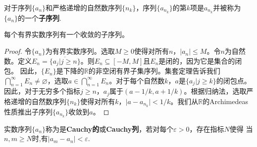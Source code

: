 \documentclass[lang=cn,newtx,10pt,scheme=chinese]{../Template/elegantbook}
\begin{document}
\begin{definition}[子序列]\label{definition:子序列}
  对于序列\(\{a_n\}\)和严格递增的自然数序列\(\{n_k\}\)，序列\(\{a_{n_k}\}\)的第\(k\)项是\(a_{n_k}\)并被称为\(\{a_n\}\)的一个\textbf{子序列}.
\end{definition}

\begin{theorem}\label{theorem:Bolzano - Weierstrass定理1}
  每个有界实数序列有一个收敛的子序列。
\end{theorem}
\begin{proof}
  令\(\{a_n\}\)为有界实数序列。选取\(M\geqslant0\)使得对所有\(n\)，\(\vert a_n\vert\leqslant M\)。令\(n\)为自然数。定义\(E_n=\overline{\{a_j|j\geqslant n\}}\)。则\(E_n\subseteq[-M,M]\)且\(E_n\)是闭的，因为它是集合的闭包。 因此，\(\{E_n\}\)是下降的\(\mathbb{R}\)的非空闭有界子集序列。集套定理告诉我们\(\bigcap_{n = 1}^{\infty}E_n\neq\varnothing\)，选取\(a\in\bigcap_{n = 1}^{\infty}E_n\)。对于每个自然数\(k\)，\(a\)是\(\{a_j|j\geqslant k\}\)的闭包点。 因此，对于无穷多个指标\(j\geqslant n\)，\(a_j\)属于\((a - 1/k,a + 1/k)\)。根据归纳法，选取严格递增的自然数序列\(\{n_k\}\)使得对所有\(k\)，\(\vert a - a_{n_k}\vert<1/k\)。我们从\(\mathbb{R}\)的Archimedeas性质推出子序列\(\{a_{n_k}\}\)收敛到\(a\)。

\end{proof}

\begin{definition}
  实数序列\(\{a_n\}\)称为是\textbf{Cauchy的}或\textbf{Cauchy列}，若对每个\(\varepsilon>0\)，存在指标\(N\)使得
  当\(n,m\geqslant N\)时,有\(\vert a_m - a_n\vert<\varepsilon\).
\end{definition}
\end{document}
